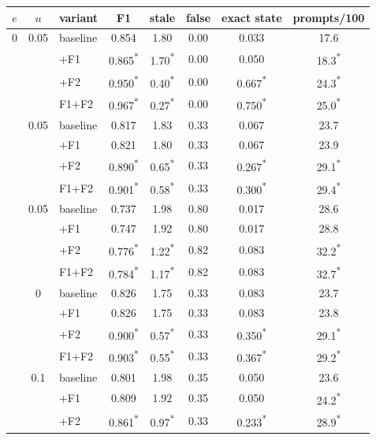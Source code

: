 \begin{tabular}{cclccccc}
\toprule
$e$ & $u$ & variant & F1 & stale & false & exact state & prompts/100 \\
\midrule
0 & 0.05 & baseline & 0.854 & 1.80 & 0.00 & 0.033 & 17.6 \\
 & & +F1 & 0.865\textsuperscript{*} & 1.70\textsuperscript{*} & 0.00 & 0.050 & 18.3\textsuperscript{*} \\
 & & +F2 & 0.950\textsuperscript{*} & 0.40\textsuperscript{*} & 0.00 & 0.667\textsuperscript{*} & 24.3\textsuperscript{*} \\
 & & F1+F2 & 0.967\textsuperscript{*} & 0.27\textsuperscript{*} & 0.00 & 0.750\textsuperscript{*} & 25.0\textsuperscript{*} \\
\addlinespace[2pt]
0.1 & 0.05 & baseline & 0.817 & 1.83 & 0.33 & 0.067 & 23.7 \\
 & & +F1 & 0.821 & 1.80 & 0.33 & 0.067 & 23.9 \\
 & & +F2 & 0.890\textsuperscript{*} & 0.65\textsuperscript{*} & 0.33 & 0.267\textsuperscript{*} & 29.1\textsuperscript{*} \\
 & & F1+F2 & 0.901\textsuperscript{*} & 0.58\textsuperscript{*} & 0.33 & 0.300\textsuperscript{*} & 29.4\textsuperscript{*} \\
\addlinespace[2pt]
0.2 & 0.05 & baseline & 0.737 & 1.98 & 0.80 & 0.017 & 28.6 \\
 & & +F1 & 0.747 & 1.92 & 0.80 & 0.017 & 28.8 \\
 & & +F2 & 0.776\textsuperscript{*} & 1.22\textsuperscript{*} & 0.82 & 0.083 & 32.2\textsuperscript{*} \\
 & & F1+F2 & 0.784\textsuperscript{*} & 1.17\textsuperscript{*} & 0.82 & 0.083 & 32.7\textsuperscript{*} \\
\addlinespace[2pt]
0.1 & 0 & baseline & 0.826 & 1.75 & 0.33 & 0.083 & 23.7 \\
 & & +F1 & 0.826 & 1.75 & 0.33 & 0.083 & 23.8 \\
 & & +F2 & 0.900\textsuperscript{*} & 0.57\textsuperscript{*} & 0.33 & 0.350\textsuperscript{*} & 29.1\textsuperscript{*} \\
 & & F1+F2 & 0.903\textsuperscript{*} & 0.55\textsuperscript{*} & 0.33 & 0.367\textsuperscript{*} & 29.2\textsuperscript{*} \\
\addlinespace[2pt]
0.1 & 0.1 & baseline & 0.801 & 1.98 & 0.35 & 0.050 & 23.6 \\
 & & +F1 & 0.809 & 1.92 & 0.35 & 0.050 & 24.2\textsuperscript{*} \\
 & & +F2 & 0.861\textsuperscript{*} & 0.97\textsuperscript{*} & 0.33 & 0.233\textsuperscript{*} & 28.9\textsuperscript{*} \\

\end{tabular}
